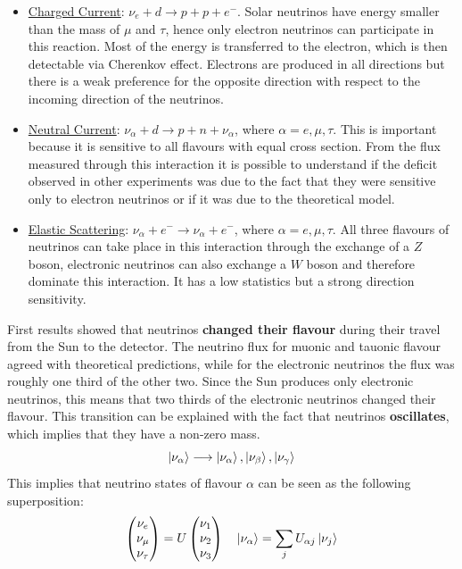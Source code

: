 \documentclass[10.75pt,a4paper,openright,bottom=2cm]{article}
\begin{document}
\begin{itemize}
    \item \underline{Charged Current}: $\nu_e+d\to p+p+e^-$. Solar neutrinos have energy smaller than the mass of $\mu$ and $\tau$, hence only electron neutrinos can participate in this reaction. Most of the energy is transferred to the electron, which is then detectable via Cherenkov effect. Electrons are produced in all directions but there is a weak preference for the opposite direction with respect to the incoming direction of the neutrinos.
    \item \underline{Neutral Current}: $\nu_\alpha+d\to p+n+\nu_\alpha$, where $\alpha=e,\mu,\tau$. This is important because it is sensitive to all flavours with equal cross section. From the flux measured through this interaction it is possible to understand if the deficit observed in other experiments was due to the fact that they were sensitive only to electron neutrinos or if it was due to the theoretical model.
    \item \underline{Elastic Scattering}: $\nu_\alpha+e^-\to\nu_\alpha+e^-$, where $\alpha=e,\mu,\tau$. All three flavours of neutrinos can take place in this interaction through the exchange of a $Z$ boson, electronic neutrinos can also exchange a $W$ boson and therefore dominate this interaction. It has a low statistics but a strong direction sensitivity. 
\end{itemize}
First results showed that neutrinos \textbf{changed their flavour} during their travel from the Sun to the detector. The neutrino flux for muonic and tauonic flavour agreed with theoretical predictions, while for the electronic neutrinos the flux was roughly one third of the other two. Since the Sun produces only electronic neutrinos, this means that two thirds of the electronic neutrinos changed their flavour. This transition can be explained with the fact that neutrinos \textbf{oscillates}, which implies that they have a non-zero mass.
\[
\ket{\nu_\alpha}\longrightarrow\ket{\nu_\alpha},\ket{\nu_\beta},\ket{\nu_\gamma}
\]
This implies that neutrino states of flavour $\alpha$ can be seen as the following superposition:
\[
\begin{pmatrix}
    \nu_e\\ \nu_\mu\\ \nu_\tau
\end{pmatrix}=U\begin{pmatrix}
    \nu_1\\ \nu_2\\ \nu_3
\end{pmatrix}
\quad
\ket{\nu_\alpha}=\sum_jU_{\alpha j}\ket{\nu_j}
\]
\end{document}
